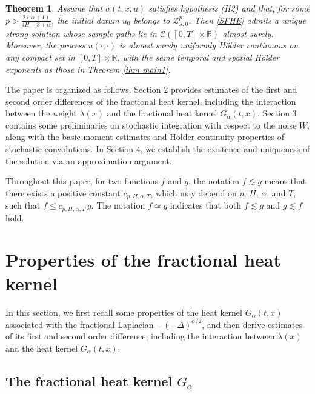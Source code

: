 \documentclass[11pt,reqno]{amsart}
\numberwithin{equation}{section}
\newtheorem{theorem}{Theorem}[section]
\newcommand{\1}{{\bf 1}}
\newcommand{\2}{{\bf 2}}
\begin{document}
\begin{theorem}\label{thm main2}  Assume that $\sigma(t,x,u)$ satisfies hypothesis (H2) and   that,  for some   $p>\frac{2(\alpha+1)}{4H-3+\alpha}$,    the   initial datum  $u_0$ belongs to $\mathcal{Z}_{\lambda,0}^p$.
 Then \eqref{SFHE} admits a unique strong solution  whose  sample paths lie in $\mathcal{C}([0,T]\times\mathbb{R})$ almost surely. Moreover,  the process $u(\cdot,\cdot)$ is almost surely uniformly H\"older continuous   on any compact set  in $[0,T]\times\mathbb{R}$, with the same temporal and spatial H\"older exponents as those in Theorem \ref{thm main1}.
 \end{theorem}
 
 
  The paper is organized as follows. Section 2 provides estimates of the first and second order differences of the fractional heat kernel, including the interaction between the weight $\lambda(x)$ and the fractional heat kernel $G_{\alpha}(t,x)$. Section 3 contains some preliminaries on stochastic integration with respect to the noise $W$, along with the basic moment estimates and H\"older continuity properties of stochastic convolutions. In Section 4, we establish the existence and uniqueness of the solution via an approximation argument.
  
  
  Throughout this paper, for two functions $f$ and $g$, the notation $f \lesssim g$ means that there exists a positive constant $c_{p,H,\alpha,T}$, which may depend on $p$, $H$, $\alpha$, and $T$, such that $f \le c_{p,H,\alpha,T}  \, g$. The notation $f \simeq g$ indicates  that both $f \lesssim g$ and $g \lesssim f$ hold.

 
\section{Properties of the fractional heat kernel}\label{subsec Aux}

In this section, we first recall some properties of the heat kernel  $G_{\alpha}(t,x)$ associated with  the fractional  Laplacian $-(-\Delta)^{ \alpha/2}$, and then derive   estimates of its first and second order difference, including   the interaction between   $\lambda(x)$ and the heat kernel $G_{\alpha}(t,x)$.

%
\subsection{The fractional  heat kernel $G_{\alpha}$}
\end{document}
